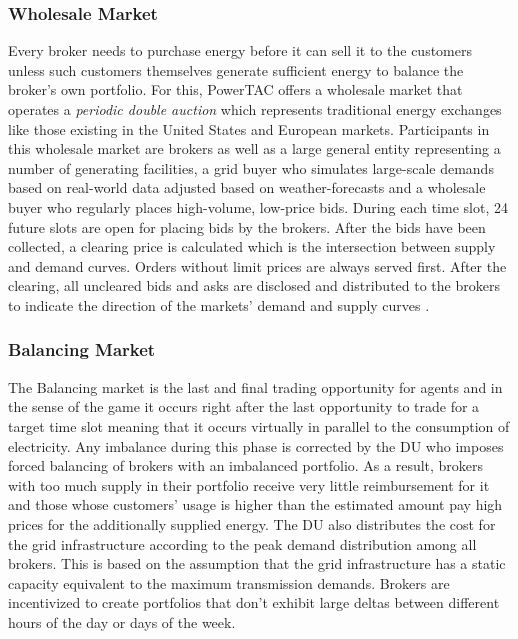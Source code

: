 \subsubsection{Wholesale Market}
Every broker needs to purchase energy before it can sell it to the customers unless such customers themselves
generate sufficient energy to balance the broker's own portfolio. For this, \ac{PowerTAC} offers a wholesale market that operates
a \emph{periodic double auction} which represents traditional energy exchanges like those existing in the United States
and European markets. Participants in this wholesale market are brokers as well as a large general entity
representing a number of generating facilities, a grid buyer who simulates large-scale demands based on real-world data
adjusted based on weather-forecasts and a wholesale buyer who regularly places high-volume, low-price bids. During each
time slot, 24 future slots are open for placing bids by the brokers. After the bids have been collected, a clearing
price is calculated which is the intersection between supply and demand curves. Orders without limit prices are
always served first. After the clearing, all uncleared bids and asks are disclosed and distributed to the brokers to indicate the
direction of the markets' demand and supply curves \citep[p.21f.]{ketter2018powertac}.

\subsubsection{Balancing Market}
The Balancing market is the last and final trading opportunity for agents and in the
sense of the game it occurs right after the last opportunity to trade for a target time slot meaning that it occurs
virtually in parallel to the consumption of electricity. Any imbalance during this phase is corrected by the \ac{DU} who
imposes forced balancing of brokers with an imbalanced portfolio. As a
result, brokers with too much supply in their portfolio receive very little reimbursement for it and those whose customers' usage is higher than the estimated amount pay
high prices for the additionally supplied energy. The \ac{DU} also distributes the cost for the grid infrastructure
according to the peak demand distribution among all brokers. This is based on the assumption that the grid
infrastructure has a static capacity equivalent to the maximum
transmission demands. Brokers are incentivized to create portfolios that don't exhibit large deltas between
different hours of the day or days of the week.

